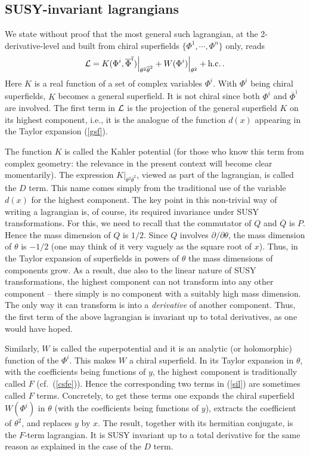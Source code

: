 \documentclass[12pt]{article}
\newcommand{\be}{\begin{equation}}
\newcommand{\ee}{\end{equation}}
\newcommand{\ol}{\overline}
\numberwithin{equation}{section}
\begin{document}
\subsection{SUSY-invariant lagrangians}
We state without proof that the most general such lagrangian, at the 2-derivative-level and built from chiral superfields $\{\Phi^1,\cdots,\Phi^n\}$ only, reads
\be
{\cal L}=K(\Phi^i,\ol{\Phi}^{\ol{\imath}})\Big|_{\theta^2\ol{\theta}^2}+
W(\Phi^i)\Big|_{\theta^2}+\mbox{h.c.}\,.\label{sil}
\ee
Here $K$ is a real function of a set of complex variables $\Phi^i$. With $\Phi^i$ being chiral superfields, $K$ becomes a general superfield. It is not chiral since both $\Phi^i$ and $\ol{\Phi}^{\ol{\imath}}$ are involved. The first term in ${\cal L}$ is the projection of the general superfield $K$ on its highest component, i.e., it is the analogue of the function $d(x)$ appearing in the Taylor expansion (\ref{gsf}). 

The function $K$ is called the Kahler potential (for those who know this term from complex geometry: the relevance in the present context will become clear momentarily). The expression $K\Big|_{\theta^2\ol{\theta}^2}$, viewed as part of the lagrangian, is called the $D$ term. This name comes simply from the traditional use of the variable $d(x)$ for the highest component. The key point in this non-trivial way of writing a lagrangian is, of course, its required invariance under SUSY transformations. For this, we need to recall that the commutator of $Q$ and $\ol{Q}$ is $P$. Hence the mass dimension of $Q$ is $1/2$. Since $Q$ involves $\partial/\partial\theta$, the mass dimension of $\theta$ is $-1/2$ (one may think of it very vaguely as the square root of $x$). Thus, in the Taylor expansion of superfields in powers of $\theta$ the mass dimensions of components grow. As a result, due also to the linear nature of SUSY transformations, the highest component can not transform into any other component -- there simply is no component with a suitably high mass dimension. The only way it can transform is into a {\it derivative} of another component. Thus, the first term of the above lagrangian is invariant up to total derivatives, as one would have hoped. 

Similarly, $W$ is called the superpotential and it is an analytic (or  holomorphic) function of the $\Phi^i$. This makes $W$ a chiral superfield. In its Taylor expansion in $\theta$, with the coefficients being functions of $y$, the highest component is traditionally called $F$ (cf.~(\ref{csfe})). Hence the corresponding two terms in (\ref{sil}) are sometimes called $F$ terms. Concretely, to get these terms one expands the chiral superfield $W(\Phi^i)$ in $\theta$ (with the coefficients being functions of $y$), extracts the coefficient of $\theta^2$, and replaces $y$ by $x$. The result, together with its hermitian conjugate, is the $F$-term lagrangian. It is SUSY invariant up to a total derivative for the same reason as explained in the case of the $D$ term.
\end{document}
